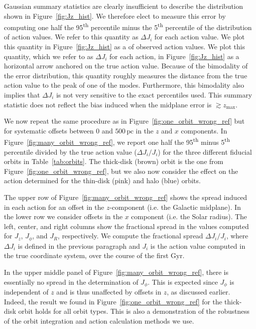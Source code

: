 \documentclass[twocolumn]{aastex62}
\newcommand{\pc}{\text{pc}}
\newcommand{\Gyr}{\text{Gyr}}
\newcommand{\uth}{\textsuperscript{th}}
\newcommand{\thincolor}{pink}
\newcommand{\thickcolor}{brown}
\newcommand{\halocolor}{blue}
\begin{document}
Gaussian summary statistics are clearly insufficient to describe the distribution shown in
Figure~\ref{fig:Jz_hist}. We therefore elect to measure this error by computing one
half the 95\uth{} percentile minus the 5\uth{} percentile of the distribution
of action values. We refer to this quantity as $\Delta J_i$ for each
action value. We plot this quantity in Figure~\ref{fig:Jz_hist} as a
of observed action values. We plot this quantity, which we refer to as $\Delta J_i$ for each action, in Figure~\ref{fig:Jz_hist} as a
horizontal arrow anchored on the true action value. Because of the bimodality
of the error distribution, this quantity roughly measures the distance from
the true action value to the peak of one of the modes. Furthermore, this
bimodality also implies that $\Delta J_i$ is not very sensitive to the exact
percentiles used. This summary statistic does not reflect the bias induced
when the midplane error is $\gtrsim z_{\text{max}}$.

We now repeat the same procedure as in Figure~\ref{fig:one_orbit_wrong_ref}
but for systematic offsets between $0$ and $500\,\pc$ in the $z$ and $x$
components. In Figure~\ref{fig:many_orbit_wrong_ref}, we report one half the
95\uth{} minus 5\uth{} percentile divided by the true action value ($\Delta
J_i/J_i$) for the three different fiducial orbits in Table~\ref{tab:orbits}.
The thick-disk (\thickcolor) orbit is the one from
Figure~\ref{fig:one_orbit_wrong_ref}, but we also now consider the effect on
the action determined for the thin-disk (\thincolor) and halo (\halocolor)
orbits.

The upper row of Figure~\ref{fig:many_orbit_wrong_ref} shows the spread
induced in each action for an offset in the $z$-component (i.e. the Galactic
midplane). In the lower row we consider offsets in the $x$ component (i.e. the
Solar radius). The left, center, and right columns show the fractional spread
in the values computed for $J_z$, $J_{\phi}$, and $J_R$, respectively. We
compute the fractional spread $\Delta J_i/J_i$, where $\Delta J_i$ is defined
in the previous paragraph and $J_i$ is the action value computed in the true
coordinate system, over the course of the first $\Gyr$.

In the upper middle panel of Figure~\ref{fig:many_orbit_wrong_ref}, there is
essentially no spread in the determination of $J_{\phi}$. This is expected
since $J_{\phi}$ is independent of $z$ and is thus unaffected by offsets in
$z$, as discussed earlier. Indeed, the result we found in
Figure~\ref{fig:one_orbit_wrong_ref} for the thick-disk orbit holds for all
orbit types. This is also a demonstration of the robustness of the orbit
integration and action calculation methods we use.
 
\end{document}
